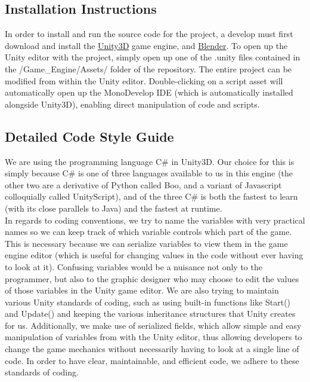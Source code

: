 \documentclass[10pt,letterpaper,oneside,english]{article}
\newcommand{\chref}[2]{\href{#1}{{\color{blue!60!black}#2}}}
\begin{document}
\subsection{Installation Instructions}
In order to install and run the source code for the project, a develop must first download and install the \chref{http://unity3d.com/unity/download/}{Unity3D} game engine, and \chref{http://www.blender.org/download/get-blender/}{Blender}. To open up the Unity editor with the project, simply open up one of the .unity files contained in the /Game\_Engine/Assets/ folder of the repository. The entire project can be modified from within the Unity editor. Double-clicking on a script asset will automatically open up the MonoDevelop IDE (which is automatically installed alongside Unity3D), enabling direct manipulation of code and scripts.
\subsection{Detailed Code Style Guide}
We are using the programming language C\# in Unity3D. Our choice for this is simply because C\# is one of three languages available to us in this engine (the other two are a derivative of Python called Boo, and a variant of Javascript colloquially called UnityScript), and of the three C\# is both the fastest to learn (with its close parallels to Java) and the fastest at runtime.\\
In regards to coding conventions, we try to name the variables with very practical names so we can keep track of which variable controls which part of the game. This is necessary because we can serialize variables to view them in the game engine editor (which is useful for changing values in the code without ever having to look at it). Confusing variables would be a nuisance not only to the programmer, but also to the graphic designer who may choose to edit the values of those variables in the Unity game editor. We are also trying to maintain various Unity standards of coding, such as using built-in functions like Start() and Update() and keeping the various inheritance structures that Unity creates for us. Additionally, we make use of serialized fields, which allow simple and easy manipulation of variables from with the Unity editor, thus allowing developers to change the game mechanics without necessarily having to look at a single line of code. In order to have clear, maintainable, and efficient code, we adhere to these standards of coding.\\
\end{document}
